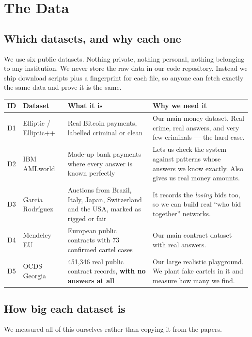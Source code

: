 \documentclass[11pt,a4paper]{article}
\begin{document}
\section{The Data}
\label{sec:data}

\subsection{Which datasets, and why each one}

We use six public datasets. Nothing private, nothing personal, nothing belonging
to any institution. We never store the raw data in our code repository. Instead
we ship download scripts plus a fingerprint for each file, so anyone can fetch
exactly the same data and prove it is the same.

\begin{longtable}{@{}p{1.1cm}p{3.5cm}p{4.2cm}p{5.8cm}@{}}
\toprule
\textbf{ID} & \textbf{Dataset} & \textbf{What it is} & \textbf{Why we need it} \\
\midrule
\endhead
D1 & Elliptic / Elliptic++ & Real Bitcoin payments, labelled criminal or clean &
Our main money dataset. Real crime, real answers, and very few criminals --- the
hard case. \\
D2 & IBM AMLworld & Made-up bank payments where every answer is known perfectly &
Lets us check the system against patterns whose answers we know exactly. Also
gives us real money amounts. \\
D3 & García Rodríguez & Auctions from Brazil, Italy, Japan, Switzerland and the
USA, marked as rigged or fair & It records the \emph{losing} bids too, so we can
build real ``who bid together'' networks. \\
D4 & Mendeley EU & European public contracts with 73 confirmed cartel cases &
Our main contract dataset with real answers. \\
D5 & OCDS Georgia & 451{,}346 real public contract records, \textbf{with no
answers at all} & Our large realistic playground. We plant fake cartels in it and
measure how many we find. \\
\bottomrule
\end{longtable}

\subsection{How big each dataset is}

We measured all of this ourselves rather than copying it from the papers.
\end{document}
